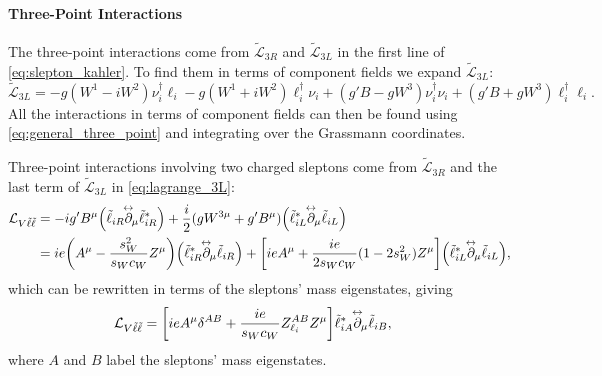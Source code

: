\paragraph{Three-Point Interactions}\label{sec:three_point}
The three-point interactions come from $\tilde{\mathcal L}_{3R}$ and $\tilde{\mathcal L}_{3L}$ in the first line of \cref{eq:slepton_kahler}. To find them in terms of component fields we expand $\tilde{\mathcal L}_{3L}$:
\begin{equation}
    \tilde{\mathcal{L}}_{3L} =
    -g (W^1-iW^2)\nu_i^\dagger\ell_i - g(W^1+iW^2)\ell_i^\dagger\nu_i
    + (g'B-gW^3)\nu_i^\dagger \nu_i
    + (g'B+gW^3)\ell_i^\dagger\ell_i.
    \label{eq:lagrange_3L}
\end{equation}
All the interactions in terms of component fields can then be found using \cref{eq:general_three_point} and integrating over the Grassmann coordinates.

Three-point interactions involving two charged sleptons come from $\tilde{\mathcal{L}}_{3R}$ and the last term of $\tilde{\mathcal{L}}_{3L}$ in \cref{eq:lagrange_3L}:
\begin{align*}
    \mathcal{L}_{V\tilde\ell\tilde\ell} &= -ig' B^\mu \Bigl( \tilde{\ell}_{iR} \overset{\hspace{-0.5em}\leftrightarrow}{\partial_{\mu}} \tilde{\ell}_{iR}^* \Bigr)
    +\frac{i}{2} (gW^{3\mu}+g'B^\mu) \Bigl( \tilde{\ell}_{iL}^* \overset{\hspace{-0.5em}\leftrightarrow}{\partial_{\mu}} \tilde{\ell}_{iL} \Bigr)
    \\
    &= ie \biggl( A^\mu - \frac{s_W^2}{s_Wc_W}Z^\mu \biggr) \Bigl( \tilde{\ell}_{iR}^* \overset{\hspace{-0.5em}\leftrightarrow}{\partial_{\mu}} \tilde{\ell}_{iR} \Bigr)
    + \biggl[ ie A^\mu + \frac{ie}{2s_Wc_W} (1-2s_W^2) Z^\mu \biggr] \Bigl( \tilde{\ell}_{iL}^* \overset{\hspace{-0.5em}\leftrightarrow}{\partial_{\mu}}  \tilde{\ell}_{iL} \Bigr),
\end{align*}
which can be rewritten in terms of the sleptons' mass eigenstates, giving
\begin{align}
    \mathcal{L}_{V\tilde\ell\tilde\ell}
    &= \biggl[ ieA^\mu \delta^{AB} + \frac{ie}{s_Wc_W} Z_{\ell_i}^{AB} Z^\mu \biggr] \tilde{\ell}_{iA}^* \overset{\hspace{-0.5em}\leftrightarrow}{\partial_{\mu}} \tilde{\ell}_{iB},
    \label{eq:L_Vll}
\end{align}
where $A$ and $B$ label the sleptons' mass eigenstates.


